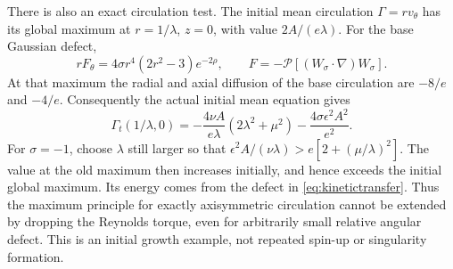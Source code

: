 \documentclass[11pt]{article}
\theoremstyle{remark}
\newcommand{\PP}{\mathcal P}
\begin{document}
There is also an exact circulation test. The initial mean circulation
$\Gamma=r v_\theta$ has its global maximum at $r=1/\lambda$, $z=0$,
with value $2A/(e\lambda)$. For the base Gaussian defect,
\[
 rF_\theta=4\sigma r^4(2r^2-3)e^{-2\rho},
 \qquad F=-\PP[(W_\sigma\cdot\nabla)W_\sigma].
\]
At that maximum the radial and axial diffusion of the base circulation
are $-8/e$ and $-4/e$. Consequently the actual initial mean equation gives
\begin{equation}\label{eq:gaussiancirculation}
 \Gamma_t(1/\lambda,0)
 =-\frac{4\nu A}{e\lambda}(2\lambda^2+\mu^2)
                         -\frac{4\sigma\epsilon^2A^2}{e^2}.
\end{equation}
For $\sigma=-1$, choose $\lambda$ still larger so that
$\epsilon^2 A/(\nu\lambda)>e[2+(\mu/\lambda)^2]$.
The value at the old maximum then increases initially, and hence exceeds
the initial global maximum. Its energy comes from the defect in
\eqref{eq:kinetictransfer}. Thus the maximum principle for exactly
axisymmetric circulation cannot be extended by dropping the Reynolds
torque, even for arbitrarily small relative angular defect. This is an
initial growth example, not repeated spin-up or singularity formation.
\end{document}
